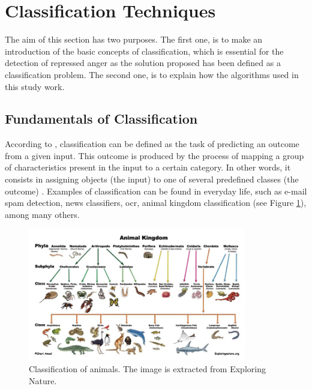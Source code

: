 
\section{Classification Techniques}
\label{sec:algorithms}

The aim of this section has two purposes. The first one, is to make an introduction of the basic concepts of classification, which is essential for the detection of repressed anger as the solution proposed has been defined as a classification problem. The second one, is to explain how the algorithms used in this study work.

\subsection{Fundamentals of Classification}

According to \cite{voznika2007data}, classification can be defined as the task of predicting an outcome from a given input. This outcome is produced by the process of mapping a group of characteristics present in the input to a certain category. In other words, it consists in assigning objects (the input) to one of several predefined classes (the outcome) \cite{pang2006introduction}. Examples of classification can be found in everyday life, such as e-mail spam detection, news classifiers, \acrfull{ocr}, animal kingdom classification (see Figure \ref{fig:animal_classification}), among many others.

\begin{figure}[!htp]
  \center
  \includegraphics[width=0.85\textwidth]{figures/animal_classification}
  \caption{Classification of animals. The image is extracted from Exploring Nature.}
  \label{fig:animal_classification}
\end{figure}


